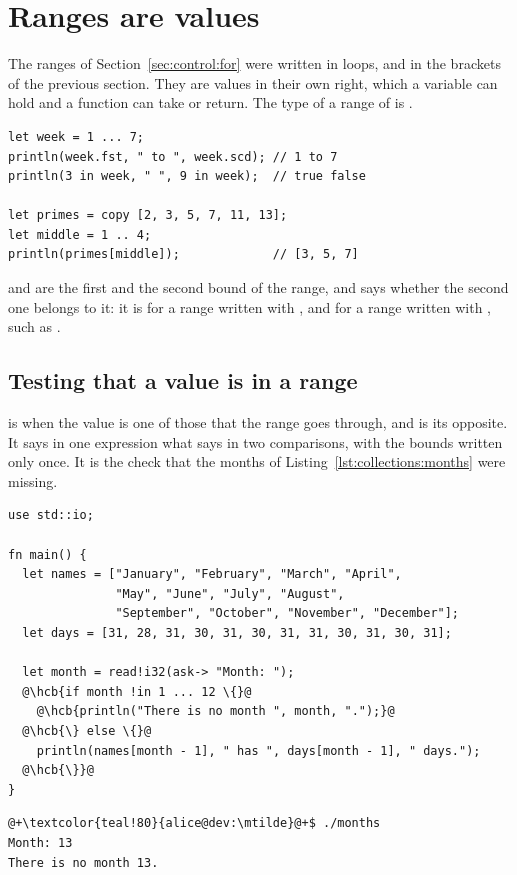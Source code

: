 \vfill\pagebreak
\section{Ranges are values}
\label{sec:collections:ranges}

The ranges of Section~\ref{sec:control:for} were written in  loops,
and in the brackets of the previous section. They are values in their own right,
which a variable can hold and a function can take or return. The type of a range
of  is .

\begin{lstlisting}[style=coloredverbatim, caption=A range stored in a variable, label=lst:collections:range_value]
let week = 1 ... 7;
println(week.fst, " to ", week.scd); // 1 to 7
println(3 in week, " ", 9 in week);  // true false

let primes = copy [2, 3, 5, 7, 11, 13];
let middle = 1 .. 4;
println(primes[middle]);             // [3, 5, 7]
\end{lstlisting}

 and  are the first and the second bound of the range,
and  says whether the second one belongs to it: it is
 for a range written with , and  for a range
written with , such as .

\subsection{Testing that a value is in a range}

 is  when the value  is one of those that the
range  goes through, and  is its opposite. It says in
one expression what  says in two comparisons, with the
bounds written only once. It is the check that the months of
Listing~\ref{lst:collections:months} were missing.

\begin{lstlisting}[style=coloredverbatim, escapechar=@, caption=Checking a month before using it as an index, label=lst:collections:months_checked]
use std::io;

fn main() {
  let names = ["January", "February", "March", "April",
               "May", "June", "July", "August",
               "September", "October", "November", "December"];
  let days = [31, 28, 31, 30, 31, 30, 31, 31, 30, 31, 30, 31];

  let month = read!i32(ask-> "Month: ");
  @\hcb{if month !in 1 ... 12 \{}@
    @\hcb{println("There is no month ", month, ".");}@
  @\hcb{\} else \{}@
    println(names[month - 1], " has ", days[month - 1], " days.");
  @\hcb{\}}@
}
\end{lstlisting}
\vspace{-10pt}%
\begin{lstlisting}[style=bashVerb, escapechar=@+]
@+\textcolor{teal!80}{alice@dev:\mtilde}@+$ ./months
Month: 13
There is no month 13.
\end{lstlisting}

